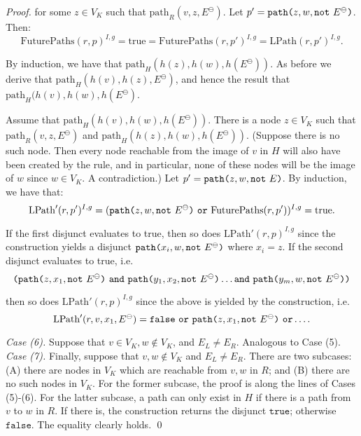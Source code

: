 \documentclass{llncs}
\newcommand{\mt}[1]{\text{\tt{#1}}}
\begin{document}
\begin{proof}
		\noindent for some $z\in V_K$ such that $\text{path}_R(v,z,E^\ominus)$. Let $p' = \mathtt{path}\mt{(}z,w,\mathtt{not}\ E^\ominus\mt{)}$. Then:
		\[ \text{FuturePaths}(r,p)^{I,g} = \text{true} = \text{FuturePaths}(r,p')^{I,g} = \text{LPath}(r,p')^{I,g}.\]
		
		\noindent By induction, we have that $\text{path}_H(h(z),h(w),h(E^\ominus))$. As before we derive that $\text{path}_H(h(v),h(z),E^\ominus)$, and hence the result that $\text{path}_H(h(v),h(w),h(E^\ominus)$.
		

	
		Assume that $\text{path}_H(h(v),h(w),h(E^\ominus))$. There is a node $z\in V_K$ such that $\text{path}_R(v,z,E^\ominus)$ and $\text{path}_H(h(z),h(w),h(E^\ominus))$. (Suppose there is no such node. Then every node reachable from the image of $v$ in $H$ will also have been created by the rule, and in particular, none of these nodes will be the image of $w$ since $w\in V_K$. A contradiction.) Let $p' = \mathtt{path}\mt{(}z,w,\mathtt{not}\ E\mt{)}$. By induction, we have that:
		\[\text{LPath}'(r,p')^{I,g} = (\mathtt{path}\mt{(}z,w,\mathtt{not}\ E^\ominus\mt{)}\ \mathtt{or}\ \text{FuturePaths}(r,p'))^{I,g} =  \text{true}.\]
		
		\noindent If the first disjunct evaluates to true, then so does $\text{LPath}'(r,p)^{I,g}$ since the construction yields a disjunct $\mathtt{path}\mt{(}x_i,w,\mathtt{not}\ E^\ominus\mt{)}$ where $x_i = z$. If the second disjunct evaluates to true, i.e.\
		\[ \mt{(}\mathtt{path}\mt{(}z,x_1,\mathtt{not}\ E^\ominus\mt{)}\ \mathtt{and}\ \mathtt{path}\mt{(}y_1,x_2,\mathtt{not}\ E^\ominus\mt{)} \dots \mathtt{and}\ \mathtt{path}\mt{(}y_m,w,\mathtt{not}\ E^\ominus\mt{)}\mt{)} \]
		
		\noindent then so does $\text{LPath}'(r,p)^{I,g}$ since the above is yielded by the construction, i.e.
		\[\text{LPath}'(r,v,x_1,E^\ominus) = \mathtt{false}\ \mathtt{or}\ \mathtt{path}\mt{(}z,x_1,\mathtt{not}\ E^\ominus\mt{)}\ \mathtt{or}\dots. \]
		
		
		\noindent \emph{Case (6).} Suppose that $v\in V_K,w\notin V_K$, and $E_L \neq E_R$. Analogous to Case (5). \\
		
		\noindent \emph{Case (7).} Finally, suppose that $v,w \notin V_K$ and $E_L \neq E_R$. There are two subcases: (A) there are nodes in $V_K$ which are reachable from $v,w$ in $R$; and (B) there are no such nodes in $V_K$. For the former subcase, the proof is along the lines of Cases (5)-(6). For the latter subcase, a path can only exist in $H$ if there is a path from $v$ to $w$ in $R$. If there is, the construction returns the disjunct $\mathtt{true}$; otherwise $\mathtt{false}$. The equality clearly holds.
		\qed
	\end{proof}
	
\end{document}
